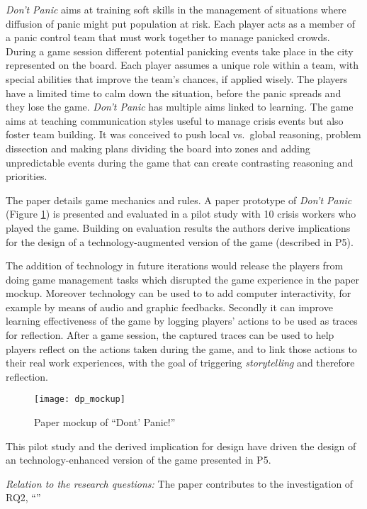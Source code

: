 \emph{Don't Panic} aims at training soft skills in the management of situations where diffusion of panic might put population at risk. Each player acts as a member of a panic control team that must work together to manage panicked crowds. During a game session different potential panicking events take place in the city represented on the board. Each player assumes a unique role within a team, with special abilities that improve the team's chances, if applied wisely. The players have a limited time to calm down the situation, before the panic spreads and they lose the game. \emph{Don't Panic} has multiple aims linked to learning. The game aims at teaching communication styles useful to manage crisis events but also foster team building. It was conceived to push local vs.~global reasoning, problem dissection and making plans dividing the board into zones and adding unpredictable events during the game that can create contrasting reasoning and priorities.

The paper details game mechanics and rules. A paper prototype of \emph{Don't Panic} (Figure \ref{fig:dp-mockup}) is presented and evaluated in a pilot study with 10 crisis workers who played the game. Building on evaluation results the authors derive implications for the design of a technology-augmented version of the game (described in P5).

The addition of technology in future iterations would release the players from doing game management tasks which disrupted the game experience in the paper mockup. Moreover technology can be used to to add computer interactivity, for example by means of audio and graphic feedbacks. Secondly it can improve learning effectiveness of the game by logging players' actions to be used as traces for reflection. After a game session, the captured traces can be used to help players reflect on the actions taken during the game, and to link those actions to their real work experiences, with the goal of triggering \emph{storytelling} and therefore reflection. 

\begin{figure}
	[tbh] \centering 
	\texttt{[image: dp\_mockup]} \caption{Paper mockup of “Dont’ Panic!”} \label{fig:dp-mockup} 
\end{figure}

This pilot study and the derived implication for design have driven the design of an technology-enhanced version of the game presented in P5.

\emph{Relation to the research questions: } The paper contributes to the investigation of RQ2, ``\RQii''

